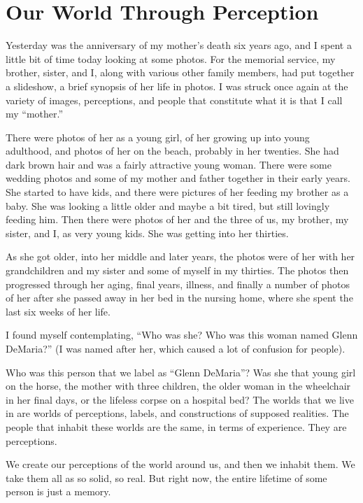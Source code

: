 
\chapter{Our World Through Perception}

Yesterday was the anniversary of my mother's death six years ago, and I spent a little bit of time today looking at some photos. For the memorial service, my brother, sister, and I, along with various other family members, had put together a slideshow, a brief synopsis of her life in photos. I was struck once again at the variety of images, perceptions, and people that constitute what it is that I call my ``mother.''

There were photos of her as a young girl, of her growing up into young adulthood, and photos of her on the beach, probably in her twenties. She had dark brown hair and was a fairly attractive young woman. There were some wedding photos and some of my mother and father together in their early years. She started to have kids, and there were pictures of her feeding my brother as a baby. She was looking a little older and maybe a bit tired, but still lovingly feeding him. Then there were photos of her and the three of us, my brother, my sister, and I, as very young kids. She was getting into her thirties.

As she got older, into her middle and later years, the photos were of her with her grandchildren and my sister and some of myself in my thirties. The photos then progressed through her aging, final years, illness, and finally a number of photos of her after she passed away in her bed in the nursing home, where she spent the last six weeks of her life.

I found myself contemplating, ``Who was she? Who was this woman named Glenn DeMaria?'' (I was named after her, which caused a lot of confusion for people).

Who was this person that we label as ``Glenn DeMaria''? Was she that young girl on the horse, the mother with three children, the older woman in the wheelchair in her final days, or the lifeless corpse on a hospital bed? The worlds that we live in are worlds of perceptions, labels, and constructions of supposed realities. The people that inhabit these worlds are the same, in terms of experience. They are perceptions.

We create our perceptions of the world around us, and then we inhabit them. We take them all as so solid, so real. But right now, the entire lifetime of some person is just a memory.

